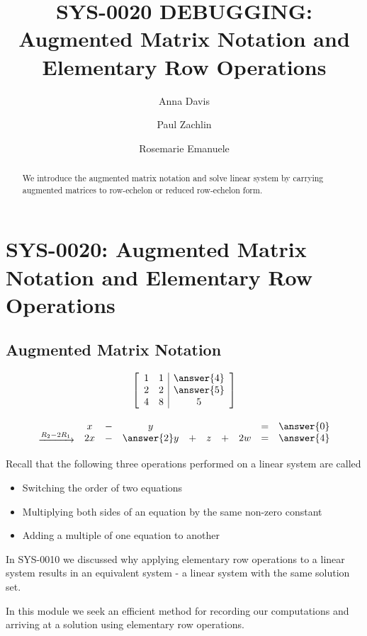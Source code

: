 \documentclass{ximera}
\author{Anna Davis \and Paul Zachlin \and Rosemarie Emanuele} \title{SYS-0020 DEBUGGING:  Augmented Matrix Notation and Elementary Row Operations} \license{CC-BY-NC-SA}
\begin{document}
\begin{abstract}
  We introduce the augmented matrix notation and solve linear system by carrying augmented matrices to row-echelon or reduced row-echelon form.
\end{abstract}
\maketitle

\section*{SYS-0020:  Augmented Matrix Notation and Elementary Row Operations}

\subsection*{Augmented Matrix Notation}
\begin{example}
$$\left[\begin{array}{cc|c}1&1&\answer{4}\\ 2&2&\answer{5} \\4&8&5\end{array}\right]$$

$$\begin{matrix}
 \\
 \xrightarrow{R_2-2R_1}\\
\end{matrix}\quad\begin{matrix}x&-&y&&&&&=&\answer{0}\\
2x&-&\answer{2}y&+&z&+&2w&=&\answer{4}\end{matrix}$$
\end{example}

Recall that the following three operations performed on a linear system are called 
\begin{itemize}
\item Switching the order of two equations
\item Multiplying both sides of an equation by the same non-zero constant
\item Adding a multiple of one equation to another
\end{itemize}


In SYS-0010 we discussed why applying elementary row operations to a linear system results in an equivalent system - a linear system with the same solution set.

In this module we seek an efficient method for recording our computations and arriving at a solution using elementary row operations. 
\end{document}
